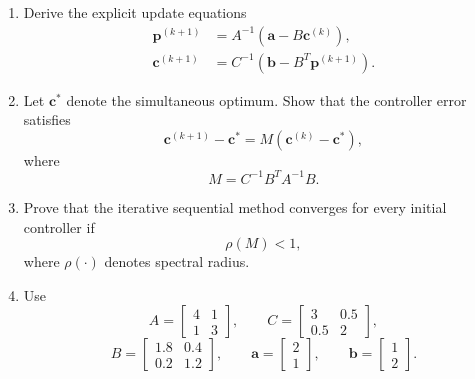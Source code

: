 \begin{enumerate}
    \item Derive the explicit update equations
    \begin{align}
    \mathbf{p}^{(k+1)}
    &=
    A^{-1}
    \left(
    \mathbf{a}-B\mathbf{c}^{(k)}
    \right),
    \\
    \mathbf{c}^{(k+1)}
    &=
    C^{-1}
    \left(
    \mathbf{b}-B^T\mathbf{p}^{(k+1)}
    \right).
    \end{align}

    \item Let $\mathbf{c}^*$ denote the simultaneous optimum. Show that the
    controller error satisfies
    \begin{equation}
    \mathbf{c}^{(k+1)}-\mathbf{c}^*
    =
    M
    \left(
    \mathbf{c}^{(k)}-\mathbf{c}^*
    \right),
    \end{equation}
    where
    \begin{equation}
    M=C^{-1}B^TA^{-1}B.
    \end{equation}

    \item Prove that the iterative sequential method converges for every
    initial controller if
    \begin{equation}
    \rho(M)<1,
    \end{equation}
    where $\rho(\cdot)$ denotes spectral radius.

    \item Use
    \begin{equation}
    A=
    \begin{bmatrix}
    4&1\\
    1&3
    \end{bmatrix},
    \qquad
    C=
    \begin{bmatrix}
    3&0.5\\
    0.5&2
    \end{bmatrix},
    \end{equation}
    \begin{equation}
    B=
    \begin{bmatrix}
    1.8&0.4\\
    0.2&1.2
    \end{bmatrix},
    \qquad
    \mathbf{a}=
    \begin{bmatrix}
    2\\1
    \end{bmatrix},
    \qquad
    \mathbf{b}=
    \begin{bmatrix}
    1\\2
    \end{bmatrix}.
    \end{equation}


\end{enumerate}
